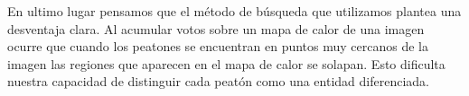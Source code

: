 \documentclass[a4paper,12pt]{article}
\begin{document}
En ultimo lugar pensamos que el método de búsqueda que utilizamos plantea una desventaja clara. Al acumular votos sobre un mapa de calor de una imagen ocurre que cuando los peatones se encuentran en puntos muy cercanos de la imagen las regiones que aparecen en el mapa de calor se solapan. Esto dificulta nuestra capacidad de distinguir cada peatón como una entidad diferenciada.

\normalsize


%
%
\end{document}
